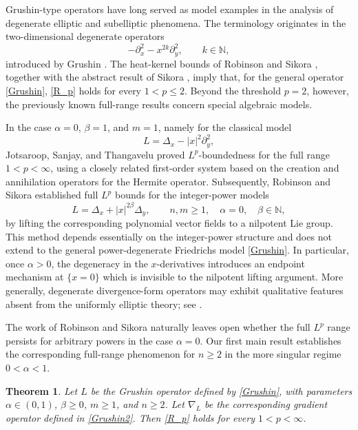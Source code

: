 \documentclass[12pt]{amsart}
\newtheorem{theorem}{Theorem}[section]
\begin{document}
Grushin-type operators have long served as model examples in the analysis of degenerate elliptic and subelliptic phenomena. The terminology originates in the two-dimensional degenerate operators
\begin{equation*}
    -\partial_x^2-x^{2k}\partial_y^2,
    \qquad k\in\mathbb N,
\end{equation*}
introduced by Grushin \cite{Grushin}. The heat-kernel bounds of Robinson and Sikora \cite{RS}, together with the abstract result of Sikora \cite{Sikora}, imply that, for the general operator \eqref{Grushin}, \eqref{R_p} holds for every $1<p\leq2$. Beyond the threshold $p=2$, however, the previously known full-range results concern special algebraic models.

In the case $\alpha=0$, $\beta=1$, and $m=1$, namely for the classical model
\begin{equation*}
    L=\Delta_x-|x|^2\partial_y^2,
\end{equation*}
Jotsaroop, Sanjay, and Thangavelu \cite{JST} proved $L^p$-boundedness for the full range $1<p<\infty$, using a closely related first-order system based on the creation and annihilation operators for the Hermite operator. Subsequently, Robinson and Sikora \cite{RS3} established full $L^p$ bounds for the integer-power models
\begin{equation*}
    L=\Delta_x+|x|^{2\beta}\Delta_y,
    \qquad
    n,m\geq1,\quad \alpha=0,\quad \beta\in\mathbb N,
\end{equation*}
by lifting the corresponding polynomial vector fields to a nilpotent Lie group. This method depends essentially on the integer-power structure and does not extend to the general power-degenerate Friedrichs model \eqref{Grushin}. In particular, once $\alpha>0$, the degeneracy in the $x$-derivatives introduces an endpoint mechanism at $\{x=0\}$ which is invisible to the nilpotent lifting argument. More generally, degenerate divergence-form operators may exhibit qualitative features absent from the uniformly elliptic theory; see \cite{ARSZ}.

The work of Robinson and Sikora naturally leaves open whether the full
$L^p$ range persists for arbitrary powers in the case $\alpha=0$. Our first main result establishes the corresponding full-range phenomenon for $n\geq2$ in the more singular regime $0<\alpha<1$.

\begin{theorem}\label{thm_main1}
Let $L$ be the Grushin operator defined by \eqref{Grushin}, with parameters
$\alpha\in(0,1)$, $\beta\geq0$, $m\geq1$, and $n\geq2$. Let $\nabla_L$ be the
corresponding gradient operator defined in \eqref{Grushin2}. Then
\eqref{R_p} holds for every $1<p<\infty$.
\end{theorem}
\end{document}
